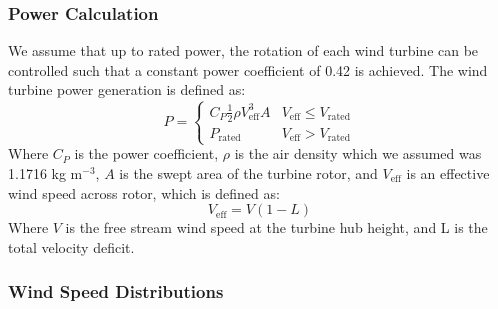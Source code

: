 \subsubsection{Power Calculation}
We assume that up to rated power, the rotation of each wind turbine can be controlled such that a constant power coefficient of 0.42 is achieved. The wind turbine power generation is defined as:
\begin{equation}
P = 
\begin{cases} 
      C_P\frac{1}{2}\rho V_{\text{eff}}^3A & V_{\text{eff}}\leq V_{\text{rated}} \\
      P_{\text{rated}} & V_{\text{eff}} > V_{\text{rated}}
   \end{cases}
\end{equation}
\noindent Where $C_P$ is the power coefficient, $\rho$ is the air density which we assumed was 1.1716 kg m$^{-3}$, $A$ is the swept area of the turbine rotor, and $V_{\text{eff}}$ is an effective wind speed across rotor, which is defined as:
\begin{equation}
V_{\text{eff}} = V(1-L)
\end{equation}
\noindent Where $V$ is the free stream wind speed at the turbine hub height, and L is the total velocity deficit.




\subsubsection{Wind Speed Distributions}


